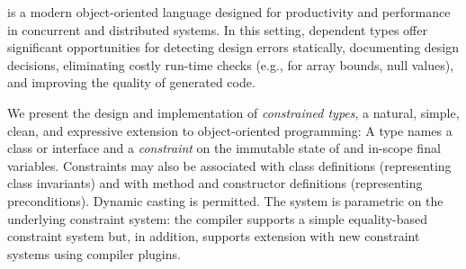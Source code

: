 \Xten{} is a modern object-oriented language designed for productivity and
performance in concurrent and distributed systems.  In this setting, dependent
types offer significant opportunities for detecting design errors statically,
documenting design decisions, eliminating costly run-time checks (e.g., for
array bounds, null values), and improving the quality of generated code.

We present the design and implementation of {\em constrained types}, a natural,
simple, clean, and expressive extension to object-oriented programming: A type
 names a class or interface  and a {\em constraint} 
on the immutable state of  and in-scope final variables.  Constraints
may also be associated with class definitions (representing class invariants)
and with method and constructor definitions (representing preconditions).
Dynamic casting is permitted.  The system is parametric on the underlying
constraint system: the compiler supports a simple equality-based constraint
system but, in addition, supports extension with new constraint systems using
compiler plugins.

